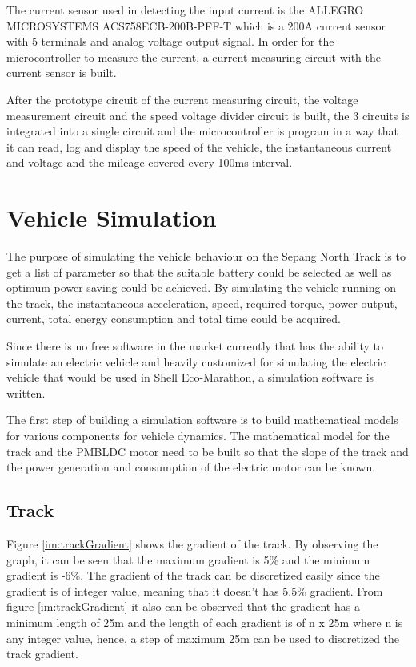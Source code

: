 The current sensor used in detecting the input current is the ALLEGRO MICROSYSTEMS ACS758ECB-200B-PFF-T which is a 200A current sensor with 5 terminals and analog voltage output signal. In order for the microcontroller to measure the current, a current measuring circuit with the current sensor is built.

After the prototype circuit of the current measuring circuit, the voltage measurement circuit and the speed voltage divider circuit is built, the 3 circuits is integrated into a single circuit and the microcontroller is program in a way that it can read, log and display the speed of the vehicle, the instantaneous current and voltage and the mileage covered every 100ms interval.

\section{Vehicle Simulation}
The purpose of simulating the vehicle behaviour on the Sepang North Track is to get a list of parameter so that the suitable battery could be selected as well as optimum power saving could be achieved. By simulating the vehicle running on the track, the instantaneous acceleration, speed, required torque, power output, current, total energy consumption and total time could be acquired.

Since there is no free software in the market currently that has the ability to simulate an electric vehicle and heavily customized for simulating the electric vehicle that would be used in Shell Eco-Marathon, a simulation software is written. 

The first step of building a simulation software is to build mathematical models for various components for vehicle dynamics. The mathematical model for the track and the PMBLDC motor need to be built so that the slope of the track and the power generation and consumption of the electric motor can be known.

\subsection{Track}
Figure \ref{im:trackGradient} shows the gradient of the track. By observing the graph, it can be seen that the maximum gradient is 5\% and the minimum gradient is -6\%. The gradient of the track can be discretized easily since the gradient is of integer value, meaning that it doesn't has 5.5\% gradient. From figure \ref{im:trackGradient} it also can be observed that the gradient has a minimum length of 25m and the length of each gradient is of n x 25m where n is any integer value, hence, a step of maximum 25m can be used to discretized the track gradient.

